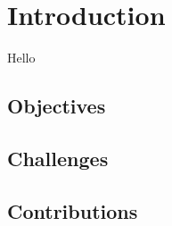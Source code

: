 \chapter{Introduction}
Hello \cite{greenwade93}
\section{Objectives}

\section{Challenges}
\section{Contributions}